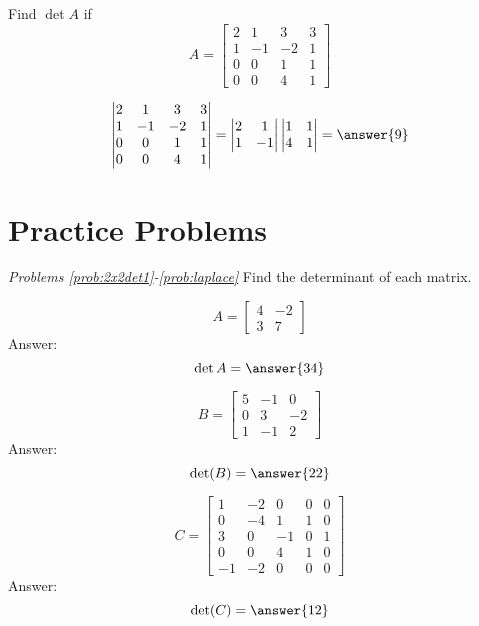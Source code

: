 \documentclass{ximera}
\begin{document}
\begin{example}\label{ex:blockTriDet}
    Find $\det{A}$ if 
    $$A=\begin{bmatrix}2&1&3&3\\1&-1&-2&1\\0&0&1&1\\0&0&4&1\end{bmatrix}$$
  \begin{explanation}
      $$\begin{vmatrix}2&1&3&3\\1&-1&-2&1\\0&0&1&1\\0&0&4&1\end{vmatrix}=\begin{vmatrix}2&1\\1&-1\end{vmatrix}\begin{vmatrix}1&1\\4&1\end{vmatrix}=\answer{9}$$
  \end{explanation}  
\end{example}


\section*{Practice Problems}

\emph{Problems \ref{prob:2x2det1}-\ref{prob:laplace}}
Find the determinant of each matrix.

  \begin{problem}\label{prob:2x2det1}
  $$A=\begin{bmatrix}4&-2\\3&7\end{bmatrix}$$
  Answer:
  $$\det{A}=\answer{34}$$
  \end{problem}
  
  \begin{problem}\label{prob:2x2det2}
  $$B=\begin{bmatrix}5&-1&0\\0&3&-2\\1&-1&2\end{bmatrix}$$
  Answer:
  $$\text{det}(B)=\answer{22}$$
  \end{problem}

  \begin{problem}\label{prob:laplace}
  $$C=\begin{bmatrix}1&-2&0&0&0\\0&-4&1&1&0\\3&0&-1&0&1\\0&0&4&1&0\\-1&-2&0&0&0\end{bmatrix}$$
   Answer:
  $$\det(C)=\answer{12}$$
 \end{problem}
\end{document}
